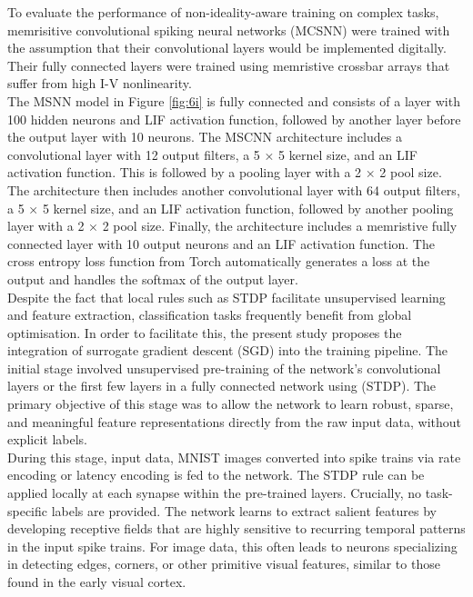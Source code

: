 \noindent To evaluate the performance of non-ideality-aware training on complex tasks, memrisitive convolutional spiking neural networks (MCSNN) were trained with the assumption that their convolutional layers would be implemented digitally. Their fully connected layers were trained using memristive crossbar arrays that suffer from high I-V nonlinearity. \\

\noindent The MSNN model in Figure \ref{fig:6i} is fully connected and consists of a layer with 100 hidden neurons and LIF activation function, followed by another layer before the output layer with 10 neurons. The MSCNN architecture includes a convolutional layer with 12 output filters, a 5 × 5 kernel size, and an LIF activation function. This is followed by a pooling layer with a 2 × 2 pool size. \\

\noindent The architecture then includes another convolutional layer with 64 output filters, a 5 × 5 kernel size, and an LIF activation function, followed by another pooling layer with a 2 × 2 pool size. Finally, the architecture includes a memristive fully connected layer with 10 output neurons and an LIF activation function. The cross entropy loss function from Torch \cite{eshraghian2023training} automatically generates a loss at the output and handles the softmax of the output layer. \\

\noindent Despite the fact that local rules such as STDP facilitate unsupervised learning and feature extraction, classification tasks frequently benefit from global optimisation. In order to facilitate this, the present study proposes the integration of surrogate gradient descent (SGD) into the training pipeline. The initial stage involved unsupervised pre-training of the network's convolutional layers or the first few layers in a fully connected network using (STDP). The primary objective of this stage was to allow the network to learn robust, sparse, and meaningful feature representations directly from the raw input data, without explicit labels.\\

\noindent During this stage, input data, MNIST images converted into spike trains via rate encoding or latency encoding is fed to the network. The STDP rule can be applied locally at each synapse within the pre-trained layers. Crucially, no task-specific labels are provided. The network learns to extract salient features by developing receptive fields that are highly sensitive to recurring temporal patterns in the input spike trains. For image data, this often leads to neurons specializing in detecting edges, corners, or other primitive visual features, similar to those found in the early visual cortex.\\

